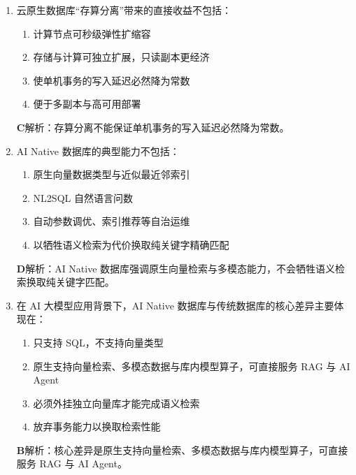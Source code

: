 \documentclass[UTF8,a4paper,11pt]{ctexart}
\newenvironment{answer}%
  {\begin{ans}\noindent{\bfseries\color{ansframe}【答案】}\hspace{0.4em}}%
  {\end{ans}}
\begin{document}
\begin{enumerate}
\item 云原生数据库“存算分离”带来的直接收益不包括：
\begin{enumerate}[label=\Alph*., leftmargin=2.2em, itemsep=1pt]
\item 计算节点可秒级弹性扩缩容
\item 存储与计算可独立扩展，只读副本更经济
\item 使单机事务的写入延迟必然降为常数
\item 便于多副本与高可用部署
\end{enumerate}
\begin{answer}
\textbf{C}\quad 解析：存算分离不能保证单机事务的写入延迟必然降为常数。
\end{answer}

\item AI Native 数据库的典型能力不包括：
\begin{enumerate}[label=\Alph*., leftmargin=2.2em, itemsep=1pt]
\item 原生向量数据类型与近似最近邻索引
\item NL2SQL 自然语言问数
\item 自动参数调优、索引推荐等自治运维
\item 以牺牲语义检索为代价换取纯关键字精确匹配
\end{enumerate}
\begin{answer}
\textbf{D}\quad 解析：AI Native 数据库强调原生向量检索与多模态能力，不会牺牲语义检索换取纯关键字匹配。
\end{answer}

\item 在 AI 大模型应用背景下，AI Native 数据库与传统数据库的核心差异主要体现在：
\begin{enumerate}[label=\Alph*., leftmargin=2.2em, itemsep=1pt]
\item 只支持 SQL，不支持向量类型
\item 原生支持向量检索、多模态数据与库内模型算子，可直接服务 RAG 与 AI Agent
\item 必须外挂独立向量库才能完成语义检索
\item 放弃事务能力以换取检索性能
\end{enumerate}
\begin{answer}
\textbf{B}\quad 解析：核心差异是原生支持向量检索、多模态数据与库内模型算子，可直接服务 RAG 与 AI Agent。
\end{answer}


\end{enumerate}
\end{document}
